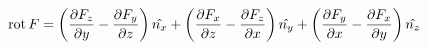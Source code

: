 \begin{equation}
	\mathop{\rm rot}F=\left(\frac{\partial F_z}{\partial y}
		-\frac{\partial F_y}{\partial z}\right)\hat{n_x}
		+\left(\frac{\partial F_x}{\partial z}
		-\frac{\partial F_z}{\partial x}\right)\hat{n_y}
		+\left(\frac{\partial F_y}{\partial x}
		-\frac{\partial F_x}{\partial y}\right)\hat{n_z}
\end{equation}
